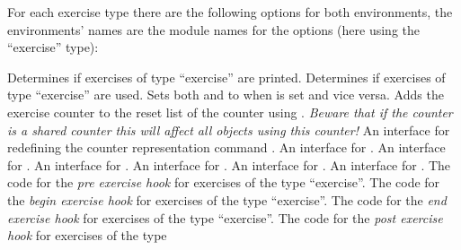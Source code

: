 \documentclass{xsim-manual}
\begin{document}
For each exercise type there are the following options for both environments,
the environments' names are the module names for the options (here using the
\enquote{exercise} type):
\begin{options}
    Determines if exercises of type \enquote{exercise} are printed.
    Determines if exercises of type \enquote{exercise} are used.
    Sets both  and  to
     when  is set and vice versa.
  \Default
    Adds the exercise counter to the reset list of the
    counter  using .  \emph{Beware that if
      the counter is a shared counter this will affect \emph{all objects}
      using this counter!}
    An interface for redefining the counter representation command
    .
    An interface for %
    .
    An interface for %
    .
    An interface for %
    .
    An interface for %
    .
    An interface for %
    .
    An interface for %
    .
  \Default
    The code for the \emph{pre exercise hook} for exercises of the type
    \enquote{exercise}.
  \Default
    The code for the \emph{begin exercise hook} for exercises of the type
    \enquote{exercise}.
  \Default
    The code for the \emph{end exercise hook} for exercises of the type
    \enquote{exercise}.
  \Default
    The code for the \emph{post exercise hook} for exercises of the type

\end{options}
\end{document}
